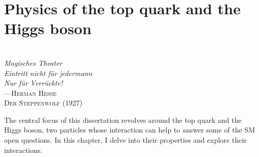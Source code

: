 






\chapter{Physics of the top quark and the Higgs boson}
\label{chap:topHiggsPhysics}

\vspace*{0.1 cm} 
\hspace*{200pt} \\
\hspace*{120pt} \textit{Magisches Theater} \\
\hspace*{120pt} \textit{Eintritt nicht für jedermann} \\
\hspace*{120pt} \textit{Nur für Verrückte!} \\
\hspace*{140pt} ---\textsc{Herman Hesse } \\%
\hspace*{165pt}     \textsc{Der Steppenwolf (1927)} \\%
\vspace*{2cm} 

The central focus of this dissertation revolves around the top quark and the Higgs boson, 
two particles whose interaction can help to answer some of the SM open questions.
In this chapter, I delve into their properties and explore their interactions.

